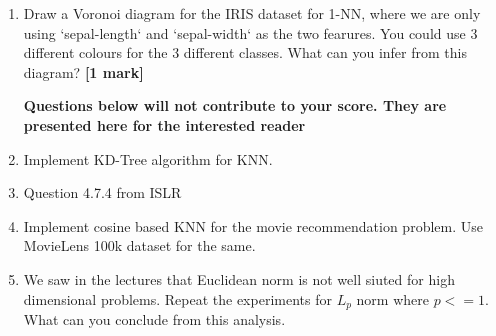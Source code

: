 \documentclass[colorlinks,linkcolor=true]{article}
\begin{document}
\begin{enumerate}
\item Draw a Voronoi diagram for the IRIS dataset for 1-NN, where we are only using `sepal-length` and `sepal-width` as the two fearures. You could use 3 different colours for the 3 different classes. What can you infer from this diagram?  \textbf{[1 mark]}




\textbf{Questions below will not contribute to your score. They are presented here for the interested reader}

\item Implement KD-Tree algorithm for KNN.
\item Question 4.7.4 from ISLR
\item Implement cosine based KNN for the movie recommendation problem. Use MovieLens 100k dataset for the same. 
\item We saw in the lectures that Euclidean norm is not well siuted for high dimensional problems. Repeat the experiments for $L_p$ norm where $p<=1$. What can you conclude from this analysis. 
\end{enumerate}
\end{document}

